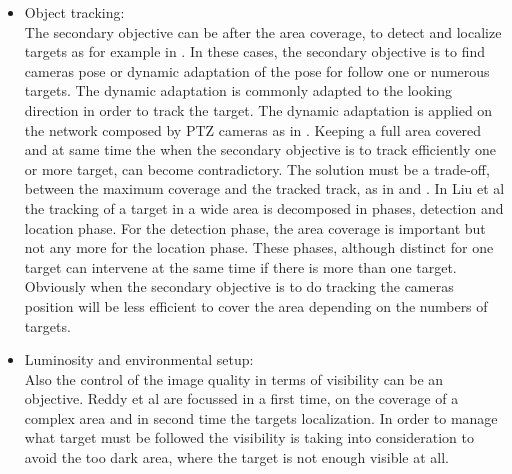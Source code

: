 \begin{itemize}
\item Object tracking: \\ The secondary objective can be after the area coverage, to detect and localize targets as for example in \cite{18*ding2012,12*soto2009,23*liu2009,39*wu2011,40*sohrabi2000,22*zhao2008}. In these cases, the secondary objective is to find cameras pose or dynamic adaptation of the pose for follow one or numerous targets. The dynamic adaptation is commonly adapted to the looking direction in order to track the target. The dynamic adaptation is applied on the network composed by PTZ cameras as in \cite{18*ding2012,38*liu2010,12*soto2009}.
Keeping a full area covered and at same time the when the secondary objective is to track efficiently one or more target, can become contradictory. The solution must be a trade-off, between the maximum coverage and the tracked track, as in \cite{18*ding2012} and \cite{38*liu2010}.
 In Liu et al \cite{38*liu2010} the tracking of a target in a wide area is decomposed in phases, detection and location phase. For the detection phase, the area coverage is important but not any more for the location phase. These phases, although distinct for one target can intervene at the same time if there is more than one target. Obviously when the secondary objective is to do tracking the cameras position will be less efficient to cover the area depending on the numbers of targets.  \\

\item  Luminosity and environmental setup:\\ Also  the  control of the image quality in terms of visibility can be an objective. Reddy et al \cite{33*reddy2012} are focussed  in a first time, on  the coverage of a complex area and in second time the targets localization. In order to manage what target must be followed the visibility is taking into consideration to avoid the too dark area, where the target is not enough visible at all. \\


\end{itemize}
